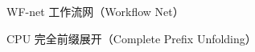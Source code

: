 \begin{denotation}[3cm]
\item[WF-net] 工作流网（Workflow Net）
\item[CPU] 完全前缀展开（Complete Prefix Unfolding）
\end{denotation}
